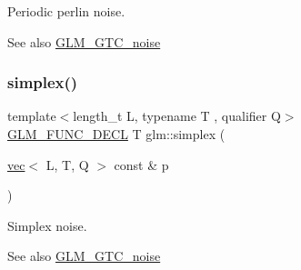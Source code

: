 Periodic perlin noise. \begin{DoxySeeAlso}{See also}
\hyperlink{group__gtc__noise}{G\+L\+M\+\_\+\+G\+T\+C\+\_\+noise} 
\end{DoxySeeAlso}
\mbox{\label{group__gtc__noise_ga8122468c69015ff397349a7dcc638b27}} 
\subsubsection{\texorpdfstring{simplex()}{simplex()}}
{\footnotesize\ttfamily template$<$length\+\_\+t L, typename T , qualifier Q$>$ \\
\hyperlink{setup_8hpp_ab2d052de21a70539923e9bcbf6e83a51}{G\+L\+M\+\_\+\+F\+U\+N\+C\+\_\+\+D\+E\+CL} T glm\+::simplex (\begin{DoxyParamCaption}\item[{\hyperlink{structglm_1_1vec}{vec}$<$ L, T, Q $>$ const \&}]{p }\end{DoxyParamCaption})}

Simplex noise. \begin{DoxySeeAlso}{See also}
\hyperlink{group__gtc__noise}{G\+L\+M\+\_\+\+G\+T\+C\+\_\+noise} 
\end{DoxySeeAlso}
